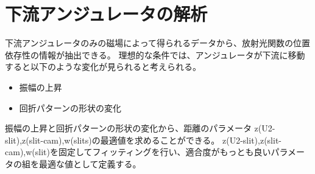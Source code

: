 \documentclass[a4paper,11pt,uplatex]{jsbook}
\begin{document}
\section{下流アンジュレータの解析}
下流アンジュレータのみの磁場によって得られるデータから、放射光関数の位置依存性の情報が抽出できる。
理想的な条件では、アンジュレータが下流に移動すると以下のような変化が見られると考えられる。
\begin{itemize}
  \item 振幅の上昇
  \item 回折パターンの形状の変化
\end{itemize}
振幅の上昇と回折パターンの形状の変化から、距離のパラメータ z(U2-slit),z(slit-cam),w(slits)の最適値を求めることができる。
z(U2-slit),z(slit-cam),w(slit)を固定してフィッティングを行い、適合度がもっとも良いパラメータの組を最適な値として定義する。
\end{document}
